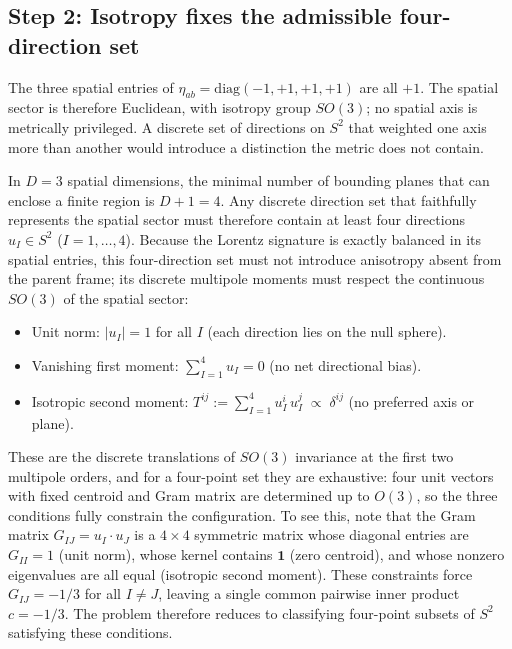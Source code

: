 \documentclass[twocolumn]{iopjournal}
\begin{document}
\subsection*{Step 2: Isotropy fixes the admissible four-direction set}

The three spatial entries of $\eta_{ab} = \mathrm{diag}(-1,+1,+1,+1)$ are all $+1$. The spatial sector is therefore Euclidean, with isotropy group $SO(3)$; no spatial axis is metrically privileged. A discrete set of directions on $S^2$ that weighted one axis more than another would introduce a distinction the metric does not contain.

In $D = 3$ spatial dimensions, the minimal number of bounding planes that can enclose a finite region is $D + 1 = 4$. Any discrete direction set that faithfully represents the spatial sector must therefore contain at least four directions $u_I \in S^2$ ($I = 1,\dots,4$). Because the Lorentz signature is exactly balanced in its spatial entries, this four-direction set must not introduce anisotropy absent from the parent frame; its discrete multipole moments must respect the continuous $SO(3)$ of the spatial sector:
\begin{itemize}
\item Unit norm: $|u_I| = 1$ for all $I$ \;\;(each direction lies on the null sphere).
\item Vanishing first moment: $\displaystyle\sum_{I=1}^{4} u_I = 0$ \;\;(no net directional bias).
\item Isotropic second moment: $\displaystyle T^{ij} := \sum_{I=1}^{4} u_I^i\, u_I^j \;\propto\; \delta^{ij}$ \;\;(no preferred axis or plane).
\end{itemize}
These are the discrete translations of $SO(3)$ invariance at the first two multipole orders, and for a four-point set they are exhaustive: four unit vectors with fixed centroid and Gram matrix are determined up to $O(3)$, so the three conditions fully constrain the configuration. To see this, note that the Gram matrix $G_{IJ} = u_I \cdot u_J$ is a $4 \times 4$ symmetric matrix whose diagonal entries are $G_{II} = 1$ (unit norm), whose kernel contains $\mathbf{1}$ (zero centroid), and whose nonzero eigenvalues are all equal (isotropic second moment). These constraints force $G_{IJ} = -1/3$ for all $I \neq J$, leaving a single common pairwise inner product $c = -1/3$. The problem therefore reduces to classifying four-point subsets of $S^2$ satisfying these conditions.
\end{document}
